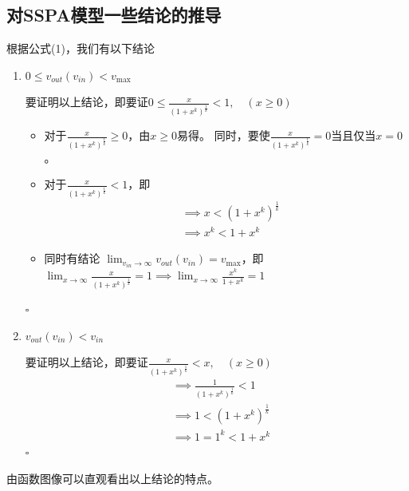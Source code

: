 \documentclass[11pt]{article}
\providecommand{\tightlist}{\setlength{\itemsep}{0pt}\setlength{\parskip}{0.2pt}}
\newenvironment{proof}{{\heiti 证明:}}{\hfill $\square$\par}
\begin{document}
\subsection{对SSPA模型一些结论的推导}
根据公式(1)，我们有以下结论
\begin{enumerate}
  \item $0\leq v_{out}(v_{in})< v_{\mathrm{max}}$
  
  \begin{proof}
    要证明以上结论，即要证$\displaystyle 0\leq \frac{x}{\left( 1+x^{k}  \right)^\frac{1}{k}}<1,\quad (x\geq 0)$\\
    \begin{itemize}
        \tightlist
      \item 对于$\displaystyle \frac{x}{\left( 1+x^{k} \right)^\frac{1}{k}}\geq 0$，由$x\geq 0$易得。
    同时，要使$\displaystyle \frac{x}{\left( 1+x^{k} \right)^\frac{1}{k}}= 0$当且仅当$x= 0$。
      \item 对于$\displaystyle \frac{x}{\left( 1+x^{k} \right)^\frac{1}{k}}<1$，即
    \begin{align*}
      &\implies x < \left( 1+x^{k} \right)^\frac{1}{k}\\
      &\implies x^k < 1 +x^{k}
    \end{align*}
      \item 同时有结论 $\displaystyle \lim_{v_{in} \to \infty} v_{out}(v_{in}) = v_{\mathrm{max}}$，即$\displaystyle \lim_{x \to \infty}\frac{x}{\left( 1+x^{k}  \right)^\frac{1}{k}}=1\implies \lim_{x \to \infty}\frac{x^k}{ 1+x^{k}  }=1$
    \end{itemize}
  \end{proof}
  \item $ v_{out}(v_{in})< v_{in} $
  
  \begin{proof}
    要证明以上结论，即要证$\displaystyle \frac{x}{\left( 1+x^{k}  \right)^\frac{1}{k}}<x,\quad (x\geq 0)$
    \begin{align*}
      &\implies \frac{1}{\left( 1+x^{k}  \right)^\frac{1}{k}}<1\\
      &\implies 1 < \left( 1+x^{k}  \right)^\frac{1}{k} \\
      &\implies 1 = 1^k <  1+x^{k}
    \end{align*}
  \end{proof}
\end{enumerate}
由函数图像可以直观看出以上结论的特点。
\end{document}
